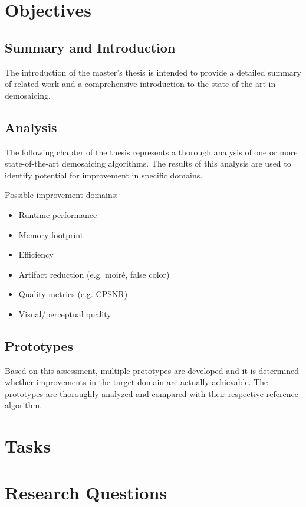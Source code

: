 \documentclass[english,notitlepage,smartquotes]{hgbreport}
\begin{document}
\section{Objectives} %

\subsection{Summary and Introduction}

The introduction of the master's thesis is intended to provide a detailed summary of related work and a comprehensive introduction to the state of the art in demosaicing.

\subsection{Analysis}

The following chapter of the thesis represents a thorough analysis of one or more state-of-the-art demosaicing algorithms. The results of this analysis are used to identify potential for improvement in specific domains.

\noindent
Possible improvement domains:

\begin{itemize}
	\item Runtime performance
	\item Memory footprint
	\item Efficiency
	\item Artifact reduction (e.g. moiré, false color)
	\item Quality metrics (e.g. CPSNR)
	\item Visual/perceptual quality
\end{itemize}

\subsection{Prototypes}

Based on this assessment, multiple prototypes are developed and it is determined whether improvements in the target domain are actually achievable. The prototypes are thoroughly analyzed and compared with their respective reference algorithm.

\section{Tasks}



\section{Research Questions}
\end{document}
